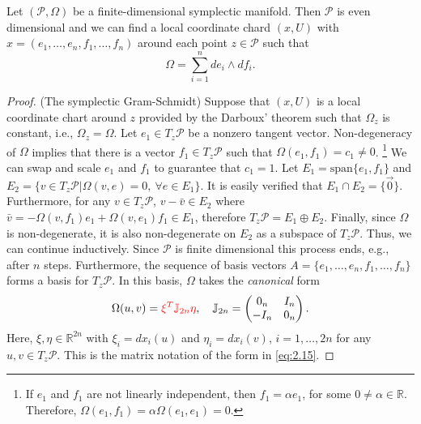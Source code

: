 \begin{corollary} \label{theorem:2.7}
Let $(\mathcal P, \Omega)$ be a finite-dimensional symplectic manifold. Then $\mathcal P$ is even dimensional and we can find a local coordinate chard $(x,U)$ with $x=(e_1,\dots,e_n,f_1,\dots,f_n)$ around each point $z\in \mathcal P$ such that
\begin{equation} \label{eq:2.15}
	\Omega = \sum_{i=1}^{n}de_i\wedge df_i.
\end{equation}
\end{corollary}
\begin{proof}
(The symplectic Gram-Schmidt) Suppose that $(x,U)$ is a local coordinate chart around $z$ provided by the Darboux' theorem such that $\Omega_z$ is constant, i.e., $\Omega_z = \Omega$. Let $e_1\in T_z\mathcal P$ be a nonzero tangent vector. Non-degeneracy of $\Omega$ implies that there is a vector $f_1\in T_z\mathcal P$ such that $\Omega(e_1,f_1) = c_1 \neq 0$. \footnote{If $e_1$ and $f_1$ are not linearly independent, then $f_1 = \alpha e_1$, for some $0\neq \alpha \in \mathbb R$. Therefore, $\Omega(e_1,f_1) = \alpha\Omega(e_1,e_1)=0$.} We can swap and scale $e_1$ and $f_1$ to guarantee that $c_1 = 1$. Let $E_1 = \text{span}\{e_1,f_1\}$ and $E_2 = \{v\in T_z\mathcal P | \Omega(v,e) = 0,~ \forall e \in E_1\}$. It is easily verified that $E_1\cap E_2 = \{ \vec 0 \}$. Furthermore, for any $v\in T_z\mathcal P$, $v - \bar v \in E_2$ where $\bar v = -\Omega(v,f_1)e_1 + \Omega(v,e_1)f_1 \in E_1$, therefore $T_z\mathcal P = E_1 \oplus E_2$. Finally, since $\Omega$ is non-degenerate, it is also non-degenerate on $E_2$ as a subspace of $T_z\mathcal P$. Thus, we can continue inductively. Since $\mathcal P$ is finite dimensional this process ends, e.g., after $n$ steps. Furthermore, the sequence of basis vectors $A = \{ e_1,\dots,e_n,f_1,\dots,f_n\}$ forms a basis for $T_z\mathcal P$. In this basis, $\Omega$ takes the \emph{canonical} form
\begin{equation} \label{eq:2.141}
	\Omega( u, v) = {\color{red}  \xi^T\mathbb J_{2n}\eta}, \quad \mathbb J_{2n} =
	\begin{pmatrix}
		0_n & I_n \\
		-I_n & 0_n
	\end{pmatrix}.
\end{equation}
Here, $\xi,\eta\in \mathbb R^{2n}$ with $\xi_i = dx_i(u)$ and $\eta_i = dx_i(v)$, $i=1,\dots,2n$ for any $u,v \in T_z\mathcal P$. This is the matrix notation of the form in \eqref{eq:2.15}.
\end{proof}

